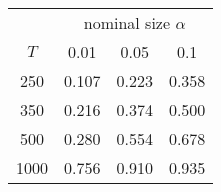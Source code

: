 % 
\begin{tabular}{cccc}
  \hline
  & \multicolumn{3}{c}{nominal size $\alpha$} \\
 $T$ & 0.01 & 0.05 & 0.1 \\
 \hline
250 & 0.107 & 0.223 & 0.358 \\ 
  350 & 0.216 & 0.374 & 0.500 \\ 
  500 & 0.280 & 0.554 & 0.678 \\ 
  1000 & 0.756 & 0.910 & 0.935 \\ 
   \hline
\end{tabular}
